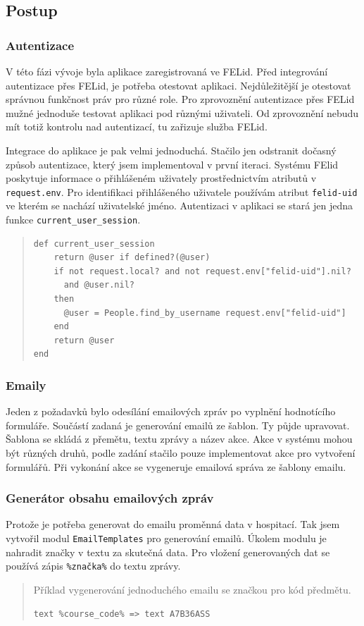 \subsection{Postup}
\subsubsection{Autentizace}
V této fázi vývoje byla aplikace zaregistrovaná ve FELid. Před integrování autentizace přes FELid, je potřeba otestovat aplikaci. Nejdůležitější je otestovat správnou funkčnost práv pro různé role. Pro zprovoznění autentizace přes FELid mužné jednoduše testovat aplikaci pod různými uživateli. Od zprovoznění nebudu mít totiž kontrolu nad autentizací, tu zařizuje služba FELid.

Integrace do aplikace je pak velmi jednoduchá. Stačilo jen odstranit dočasný způsob autentizace, který jsem implementoval v první iteraci. Systému FElid poskytuje informace o přihlášeném uživately prostřednictvím atributů v \verb|request.env|. Pro identifikaci přihlášeného uživatele používám atribut \verb|felid-uid| ve kterém se nachází uživatelské jméno. Autentizaci v aplikaci se stará jen jedna funkce \verb|current_user_session|.

\begin{quote}
\begin{verbatim}
def current_user_session
    return @user if defined?(@user)
    if not request.local? and not request.env["felid-uid"].nil? 
      and @user.nil? 
    then
      @user = People.find_by_username request.env["felid-uid"]
    end
    return @user
end
\end{verbatim} 
\end{quote}

\subsubsection{Emaily}
Jeden z požadavků bylo odesílání emailových zpráv po vyplnění hodnotícího formuláře. Součástí zadaná je generování emailů ze šablon. Ty půjde upravovat. Šablona se skládá z přemětu, textu zprávy a název akce. Akce v systému mohou být různých druhů, podle zadání stačilo pouze implementovat akce pro vytvoření formulářů. Při vykonání akce se vygeneruje emailová správa ze šablony emailu.

\subsubsection{Generátor obsahu emailových zpráv}
Protože je potřeba generovat do emailu proměnná data v hospitací. Tak jsem vytvořil modul \verb|EmailTemplates| pro generování emailů. Úkolem modulu je nahradit značky v textu za skutečná data. Pro vložení generovaných dat se používá zápis \verb|%značka%| do textu zprávy. 
\begin{quote}
Příklad vygenerování jednoduchého emailu se značkou pro kód předmětu.
\begin{verbatim}
text %course_code% => text A7B36ASS
\end{verbatim} 
\end{quote}

